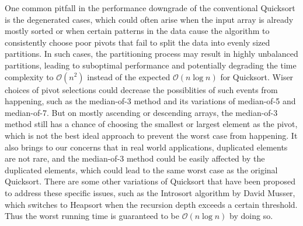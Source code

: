\documentclass{article}
\newcommand{\bigO}{\mathcal{O}}
\begin{document}
One common pitfall in the performance downgrade of the conventional Quicksort is the degenerated cases,
which could often arise when the input array is already mostly sorted or when certain patterns in the data cause the algorithm to consistently choose poor pivots
that fail to split the data into evenly sized partitions. 
In such cases, the partitioning process may result in highly unbalanced partitions, leading to suboptimal performance and
potentially degrading the time complexity to $\bigO(n^2)$ instead of the expected $\bigO(n\log n)$ for Quicksort.
Wiser choices of pivot selections could decrease the possiblities of such events from happening, such as the median-of-3 method and its variations of median-of-5 and median-of-7.
But on mostly ascending or descending arrays, the median-of-3 method still has a chance of choosing the smallest or largest element as the pivot,
which is not the best ideal approach to prevent the worst case from happening. It also brings to our concerns that in real world applications, duplicated elements are not rare,
and the median-of-3 method could be easily affected by the duplicated elements, which could lead to the same worst case as the original Quicksort. 
There are some other variations of Quicksort that have been proposed to address these specific issues, such as the Introsort algorithm \cite{Introsort} by David Musser,
which switches to Heapsort when the recursion depth exceeds a certain threshold. Thus the worst running time is guaranteed to be $\bigO(n\log n)$ by doing so.
\end{document}
